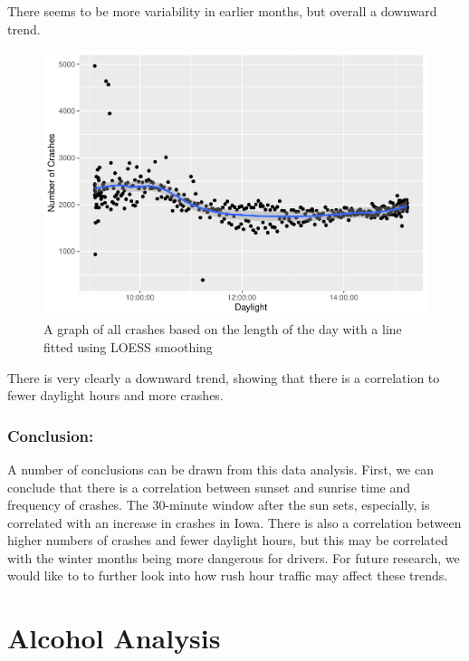 \documentclass[conference,final,]{IEEEtran}
\begin{document}
There seems to be more variability in earlier months, but overall a downward trend.

\begin{figure}

{\centering \includegraphics[width=0.9\columnwidth]{CAUSE_files/figure-latex/unnamed-chunk-5-1} 

}

\caption{A graph of all crashes based on the length of the day with a line fitted using LOESS smoothing}\label{fig:unnamed-chunk-5}
\end{figure}

There is very clearly a downward trend, showing that there is a correlation to fewer daylight hours and more crashes.

\hypertarget{conclusion}{%
\subsubsection{Conclusion:}\label{conclusion}}

A number of conclusions can be drawn from this data analysis. First, we can conclude that there is a correlation between sunset and sunrise time and frequency of crashes. The 30-minute window after the sun sets, especially, is correlated with an increase in crashes in Iowa. There is also a correlation between higher numbers of crashes and fewer daylight hours, but this may be correlated with the winter months being more dangerous for drivers. For future research, we would like to to further look into how rush hour traffic may affect these trends.

\hypertarget{alcohol-analysis}{%
\section{Alcohol Analysis}\label{alcohol-analysis}}
\end{document}
